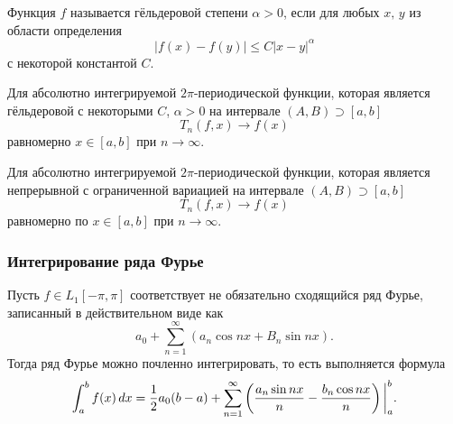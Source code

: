 \begin{to_def}
    Функция $f$ называется гёльдеровой степени $\alpha > 0$, если для любых $x, \, y$ из области определения
    \begin{equation*}
        |f(x) -f(y)| \leq C |x-y|^{\alpha}
    \end{equation*}
    с некоторой константой $C$.
\end{to_def}


\begin{to_thr}
    Для абсолютно интегрируемой $2\pi$-периодической функции, которая является гёльдеровой с некоторыми $C$, $\alpha > 0$ на интервале $(A, B) \supset [a, b]$
    \begin{equation*}
        T_n (f, x) \to f(x)
    \end{equation*}
    равномерно $x \in [a, b]$ при $n \to \infty$.
\end{to_thr}

\begin{to_thr}
    Для абсолютно интегрируемой $2\pi$-периодической функции, которая является непрерывной с ограниченной вариацией на интервале $(A, B) \supset [a, b]$
    \begin{equation*}
        T_n (f, x) \to f(x)
    \end{equation*}
    равномерно по $x \in [a, b]$ при $n \to \infty$.
\end{to_thr}




\subsubsection*{Интегрирование ряда Фурье}

\begin{to_thr}
    Пусть $f \in L_1 [-\pi, \pi]$ соответствует не обязательно сходящийся ряд Фурье, записанный в действительном виде как
    \begin{equation*}
        a_0 + \sum_{n=1}^{\infty} (a_n \cos nx + B_n \sin nx).
    \end{equation*}
    Тогда ряд Фурье можно почленно интегрировать, то есть выполняется формула
    \begin{equation*}
        \int_a^b f(x) \, d x =    
        \frac{1}{2} a_0 (b-a) + 
        \sum_{n=1}^{\infty} \left(
            \frac{a_n \sin n x}{n} -
            \frac{b_n \cos nx }{n}
        \right) \bigg|_a^b.
    \end{equation*}
\end{to_thr}



